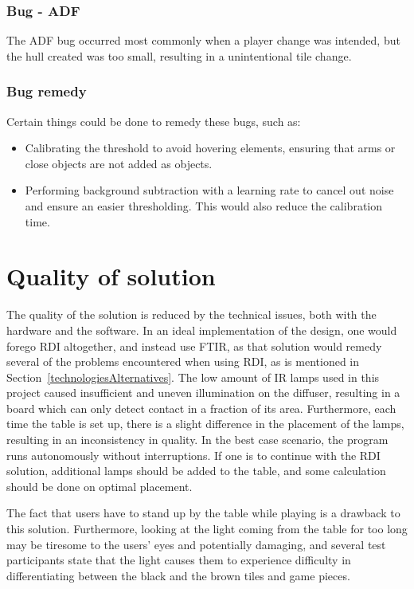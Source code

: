 \subsubsection*{Bug - ADF} 
The ADF bug occurred most commonly when a player change was intended, but the hull created was too small, resulting in a unintentional tile change.

\subsubsection*{Bug remedy}
Certain things could be done to remedy these bugs, such as:
\begin{itemize}
	\item Calibrating the threshold to avoid hovering elements, ensuring that arms or close objects are not added as objects.
	\item Performing background subtraction with a learning rate to cancel out noise and ensure an easier thresholding. This would also reduce the calibration time.
\end{itemize}

\section{Quality of solution}
The quality of the solution is reduced by the technical issues, both with the hardware and the software. In an ideal implementation of the design, one would forego RDI altogether, and instead use FTIR, as that solution would remedy several of the problems encountered when using RDI, as is mentioned in Section~\ref{technologiesAlternatives}. The low amount of IR lamps used in this project caused insufficient and uneven illumination on the diffuser, resulting in a board which can only detect contact in a fraction of its area. Furthermore, each time the table is set up, there is a slight difference in the placement of the lamps, resulting in an inconsistency in quality. In the best case scenario, the program runs autonomously without interruptions. If one is to continue with the RDI solution, additional lamps should be added to the table, and some calculation should be done on optimal placement. 

The fact that users have to stand up by the table while playing is a drawback to this solution. Furthermore, looking at the light coming from the table for too long may be tiresome to the users' eyes and potentially damaging, and several test participants state that the light causes them to experience difficulty in differentiating between the black and the brown tiles and game pieces.

